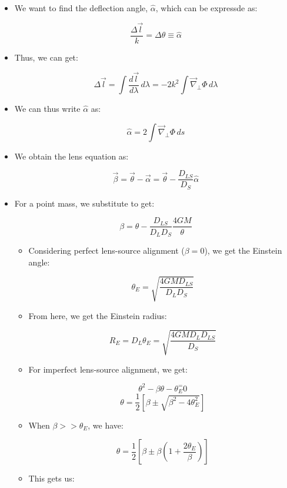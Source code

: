 \begin{itemize}
\begin{itemize}
        \item We want to find the deflection angle, $\hat{\alpha}$, which can be expressde as:

          $$\frac{\Delta\vec{l}}{k}=\Delta \theta\equiv \hat{\alpha}$$

        \item Thus, we can get:

          $$\Delta\vec{l}=\int\frac{d\vec{l}}{d\lambda}\,d\lambda=-2k^2\int\vec{\nabla}_{\perp}\Phi\,d\lambda$$

        \item We can thus write $\hat{\alpha}$ as:

          $$\hat{\alpha}=2\int\vec{\nabla}_{\perp}\Phi\,ds$$

        \item We obtain the lens equation as:

          $$\vec{\beta}=\vec{\theta}-\vec{\alpha}=\vec{\theta}-\frac{D_{LS}}{D_{S}}\hat{\alpha}$$

        \item For a point mass, we substitute to get:

          $$\beta=\theta-\frac{D_{LS}}{D_LD_S}\frac{4GM}{\theta}$$

          \begin{itemize}

            \item Considering perfect lens-source alignment ($\beta=0$), we get the Einstein angle:

              $$\theta_E=\sqrt{\frac{4GMD_{LS}}{D_LD_S}}$$

            \item From here, we get the Einstein radius:

              $$R_E=D_L\theta_E=\sqrt{\frac{4GMD_LD_{LS}}{D_S}}$$

            \item For imperfect lens-source alignment, we get:

              $$\theta^2-\beta\theta-\theta_E^=0$$
              $$\theta=\frac{1}{2}\left[ \beta\pm\sqrt{\beta^2-4\theta_E^2} \right]$$

            \item When $\beta>>\theta_E$, we have:

              $$\theta=\frac{1}{2}\left[ \beta\pm\beta\left( 1+\frac{2\theta_E}{\beta} \right) \right]$$

            \item This gets us:


\end{itemize}
\end{itemize}
\end{itemize}
